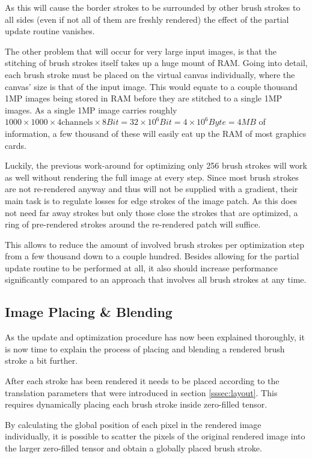 As this will cause the border strokes to be surrounded by other brush strokes to all
sides (even if not all of them are freshly rendered) the effect of the partial update
routine vanishes.

The other problem that will occur for very large input images, is that the stitching
of brush strokes itself takes up a huge mount of RAM.
Going into detail, each brush stroke must be placed on the virtual canvas individually, 
where the canvas' size is that of the input image.
This would equate to a couple thousand 1MP images being stored in RAM before they
are stitched to a single 1MP images.
As a single 1MP image carries roughly $1000 \times 1000 \times 4 \text{channels}
\times 8 Bit = 32 \times 10^{6} Bit = 4 \times 10^{6} Byte = 4 MB$ of information,
a few thousand of these will easily eat up the RAM of most graphics cards.

Luckily, the previous work-around for optimizing only 256 brush strokes will work
as well without rendering the full image at every step.
Since most brush strokes are not re-rendered anyway and thus will not be supplied with
a gradient, their main task is to regulate losses for edge strokes of the image patch.
As this does not need far away strokes but only those close the strokes that are
optimized, a ring of pre-rendered strokes around the re-rendered patch will suffice.

This allows to reduce the amount of involved brush strokes per optimization step
from a few thousand down to a couple hundred.
Besides allowing for the partial update routine to be performed at all, it also
should increase performance significantly compared to an approach that involves
all brush strokes at any time.

\subsection{Image Placing \& Blending}
As the update and optimization procedure has now been explained thoroughly, it is
now time to explain the process of placing and blending a rendered brush stroke a
bit further.

After each stroke has been rendered it needs to be placed according to the translation
parameters that were introduced in section \ref{sssec:layout}.
This requires dynamically placing each brush stroke inside zero-filled tensor.

By calculating the global position of each pixel in the rendered image individually,
it is possible to scatter the pixels of the original rendered image into the larger
zero-filled tensor and obtain a globally placed brush stroke.

